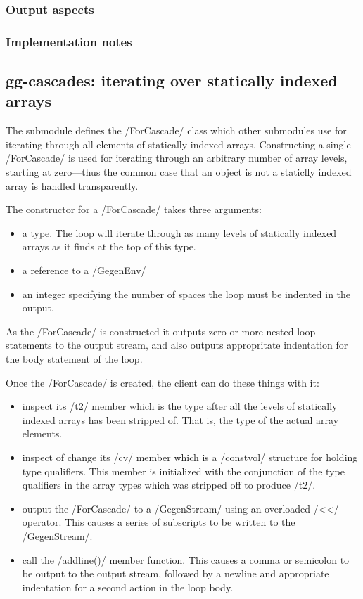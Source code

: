 \begin{docpart}
\subsubsection{Output aspects}

\subsubsection{Implementation notes}

\subsection{gg-cascades: iterating over statically indexed arrays}

The submodule defines the /ForCascade/ class which other submodules
use for iterating through all elements of statically indexed arrays.
Constructing a single /ForCascade/ is used for iterating through
an arbitrary number of array levels, starting at zero---thus the
common case that an object is not a staticlly indexed array is
handled transparently.

The constructor for a /ForCascade/ takes three arguments:
\begin{itemize}
\item a \coreC type. The loop will iterate through as many levels of
      statically indexed arrays as it finds at the top of this type.
\item a reference to a /GegenEnv/
\item an integer specifying the number of spaces the loop must
      be indented in the output.
\end{itemize}
As the /ForCascade/ is constructed it outputs zero or more nested
loop statements to the output stream, and also outputs appropritate
indentation for the body statement of the loop.

Once the /ForCascade/ is created, the client can do these things
with it:
\begin{itemize}
\item inspect its /t2/ member which is the type after all the
      levels of statically indexed arrays has been stripped of.
      That is, the type of the actual array elements.
\item inspect of change its /cv/ member which is a /constvol/
      structure for holding type qualifiers. This member is
      initialized with the conjunction of the type qualifiers
      in the array types which was stripped off to produce /t2/.
\item output the /ForCascade/ to a /GegenStream/ using an
      overloaded /<</ operator. This causes a series of subscripts
      to be written to the /GegenStream/.
\item call the /addline()/ member function. This causes a comma or
      semicolon to be output to the output stream, followed by
      a newline and appropriate indentation for a second action in the
      loop body.
\end{itemize}


\end{docpart}

